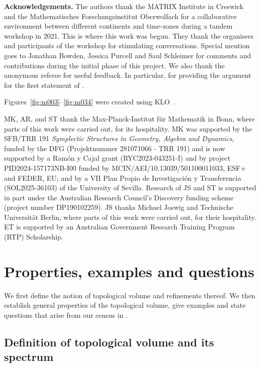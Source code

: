 \documentclass[a4paper]{gtart}
\theoremstyle{definition}
\theoremstyle{remark}
\numberwithin{equation}{section}
\begin{document}
\textbf{Acknowledgements.} 
The authors thank the MATRIX Institute in Creswick and the Ma\-the\-ma\-tisches Forschungsinstitut Oberwolfach for a collaborative environment between different continents and time-zones during a tandem workshop in 2021. This is where this work was begun. They thank the organisers and participants of the workshop for stimulating conversations. Special mention goes to Jonathan Bowden, Jessica Purcell and Saul Schleimer for comments and contributions during the initial phase of this project. We also thank the anonymous referee for useful feedback. In particular, for providing the argument for the first statement of .

Figures~\ref{fig:m003}--\ref{fig:m034} were created using KLO~\cite{KLO}.

MK, AR, and ST thank the Max-Planck-Institut f\"ur Mathematik in Bonn, where parts of this work were carried out, for its hospitality. MK was supported by the SFB/TRR 191 \textit{Symplectic Structures in Geometry, Algebra and Dynamics}, funded by the DFG (Projektnummer 281071066 - TRR 191) and is now supported by a Ram\'on y Cajal grant (RYC2023-043251-I) and by project PID2024-157173NB-I00 funded by MCIN/AEI/10.13039/501100011033, ESF+ and FEDER, EU; and by a VII Plan Propio de Investigaci\'on y Transferencia (SOL2025-36103) of the University of Sevilla.
Research of JS and ST is supported in part under the Australian Research Council's Discovery funding scheme (project number DP190102259). JS thanks Michael Joswig and Technische Universit\"at Berlin, where parts of this work were carried out, for their hospitality. ET is supported by an Australian Government Research Training Program (RTP) Scholarship.


\section{Properties, examples and questions}
\label{sec:Properties}

We first define the notion of topological volume and refinements thereof. We then establish general properties of the topological volume, give examples and state questions that arise from our census in .

\subsection{Definition of topological volume and its spectrum}\label{sec:definition}
\end{document}

